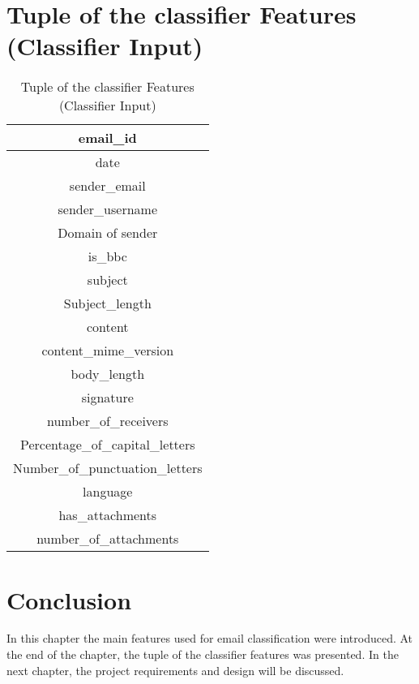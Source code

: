 \newpage
\section {Tuple of the classifier Features (Classifier Input)}
\label{sec:3_classifier_tuple}

\begin{center}
\begin{table}[H]
\begin{center}
\begin{tabular}{|c|}
\hline 
email\_id\tabularnewline
\hline
date\tabularnewline
\hline 
sender\_email\tabularnewline
\hline 
sender\_username\tabularnewline
\hline 
Domain of sender\tabularnewline
\hline 
is\_bbc\tabularnewline
\hline 
subject\tabularnewline
\hline 
Subject\_length\tabularnewline
\hline 
content\tabularnewline
\hline 
content\_mime\_version\tabularnewline
\hline 
body\_length\tabularnewline
\hline 
signature\tabularnewline
\hline 
number\_of\_receivers\tabularnewline
\hline 
Percentage\_of\_capital\_letters\tabularnewline
\hline 
Number\_of\_punctuation\_letters\tabularnewline
\hline 
language\tabularnewline
\hline 
has\_attachments\tabularnewline
\hline 
number\_of\_attachments\tabularnewline
\hline
\end{tabular}
\end{center}
\caption[Tuple of the classifier Features (Classifier Input)]{Tuple of the classifier Features (Classifier Input)}
\end{table}
\end{center}

\newpage


\section{Conclusion}
\label{sec:conclusion_3}
In this chapter the main features used for email classification were introduced.
At the end of the chapter, the tuple of the classifier features was presented. In the next chapter, the project requirements and design  will be  discussed.
